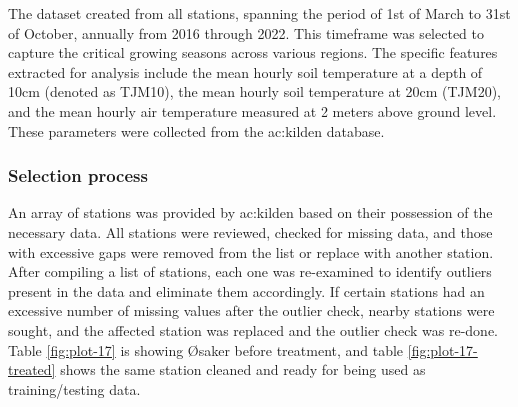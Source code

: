 
The dataset created from all stations, spanning the period of 1st of March to 31st of October, annually from 2016 through 2022. This timeframe was selected to capture the critical growing seasons across various regions. The specific features extracted for analysis include the mean hourly soil temperature at a depth of 10cm (denoted as TJM10), the mean hourly soil temperature at 20cm (TJM20), and the mean hourly air temperature measured at 2 meters above ground level. These parameters were collected from the \acrfull{ac:kilden} database.

\subsubsection{Selection process}

An array of stations was provided by \acrshort{ac:kilden} based on their possession of the necessary data. All stations were reviewed, checked for missing data, and those with excessive gaps were removed from the list or replace with another station. After compiling a list of stations, each one was re-examined to identify outliers present in the data and eliminate them accordingly. If certain stations had an excessive number of missing values after the outlier check, nearby stations were sought, and the affected station was replaced and the outlier check was re-done. Table \ref{fig:plot-17} is showing Øsaker before treatment, and table \ref{fig:plot-17-treated} shows the same station cleaned and ready for being used as training/testing data.


